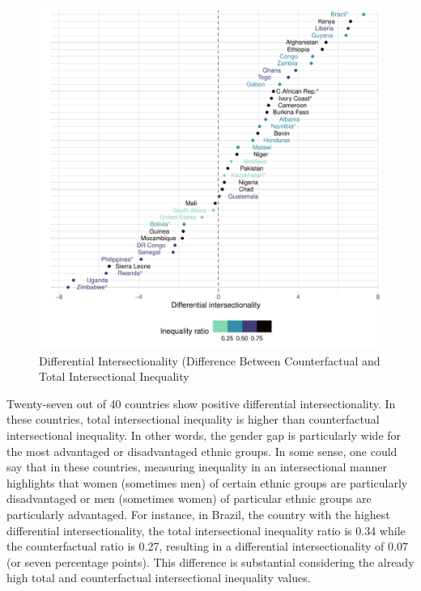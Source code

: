 \begin{figure}[htb]
\includegraphics{figures/diff-mech.pdf} 
\caption[Differential Intersectionality]{Differential Intersectionality (Difference Between Counterfactual and Total Intersectional Inequality}
\label{fig:diff-mech}
 \end{figure}

Twenty-seven out of 40 countries show positive differential intersectionality. In these countries, total intersectional inequality is higher than counterfactual intersectional inequality. In other words, the gender gap is particularly wide for the most advantaged or disadvantaged ethnic groups. In some sense, one could say that in these countries, measuring inequality in an intersectional manner highlights that women (sometimes men) of certain ethnic groups are particularly disadvantaged or men (sometimes women) of particular ethnic groups are particularly advantaged. For instance, in Brazil, the country with the highest differential intersectionality, the total intersectional inequality ratio is 0.34 while the counterfactual ratio is 0.27, resulting in a differential intersectionality of 0.07 (or seven percentage points). This difference is substantial considering the already high total and counterfactual intersectional inequality values.

